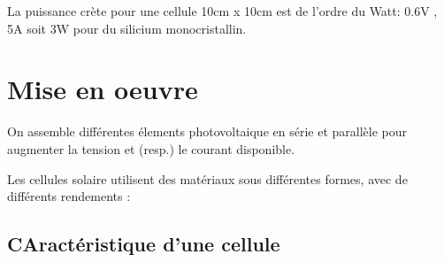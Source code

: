 \documentclass[main.tex]{subfiles}
\begin{document}
\begin{prop}
  La puissance crète pour une cellule 10cm x 10cm est de l'ordre du Watt: 0.6V , 5A soit 3W pour du silicium monocristallin.
\end{prop}

\section{Mise en oeuvre}


On assemble différentes élements photovoltaique en série et parallèle pour augmenter la tension et (resp.) le courant disponible.

Les cellules solaire utilisent des matériaux sous différentes formes, avec de différents rendements :


\subsection{CAractéristique d'une cellule}
\end{document}
